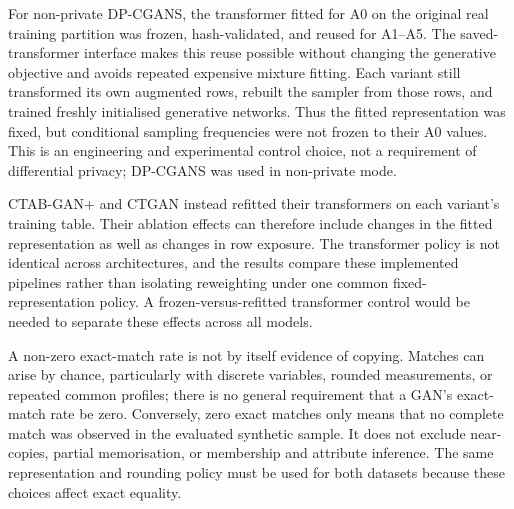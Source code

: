 For non-private DP-CGANS, the transformer fitted for A0 on the original
real training partition was frozen, hash-validated, and reused for A1--A5.
The saved-transformer interface makes this reuse possible without changing
the generative objective and avoids repeated expensive mixture fitting.
Each variant still transformed its own augmented rows, rebuilt the sampler
from those rows, and trained freshly initialised generative networks. Thus
the fitted representation was fixed, but conditional sampling frequencies
were not frozen to their A0 values. This is an engineering and experimental
control choice, not a requirement of differential privacy; DP-CGANS was
used in non-private mode.

CTAB-GAN+ and CTGAN instead refitted their transformers on each variant's
training table. Their ablation effects can therefore include changes in
the fitted representation as well as changes in row exposure. The
transformer policy is not identical across architectures, and the results
compare these implemented pipelines rather than isolating reweighting under
one common fixed-representation policy. A frozen-versus-refitted transformer
control would be needed to separate these effects across all models.


A non-zero exact-match rate is not by itself evidence of copying. Matches
can arise by chance, particularly with discrete variables, rounded
measurements, or repeated common profiles; there is no general requirement
that a GAN's exact-match rate be zero. Conversely, zero exact matches only
means that no complete match was observed in the evaluated synthetic
sample. It does not exclude near-copies, partial memorisation, or membership
and attribute inference. The same representation and rounding policy must
be used for both datasets because these choices affect exact equality.

